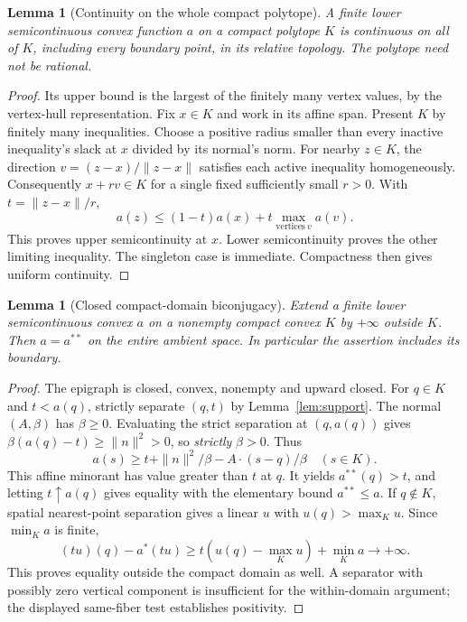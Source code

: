 \documentclass[11pt]{article}
\newtheorem{lemma}[theorem]{Lemma}
\begin{document}
\begin{lemma}[Continuity on the whole compact polytope]\label{lem:boundary}
A finite lower semicontinuous convex function $a$ on a compact polytope $K$ is continuous on all of $K$, including every boundary point, in its relative topology. The polytope need not be rational.
\end{lemma}
\begin{proof}
Its upper bound is the largest of the finitely many vertex values, by the vertex-hull representation. Fix $x\in K$ and work in its affine span. Present $K$ by finitely many inequalities. Choose a positive radius smaller than every inactive inequality's slack at $x$ divided by its normal's norm. For nearby $z\in K$, the direction $v=(z-x)/\|z-x\|$ satisfies each active inequality homogeneously. Consequently $x+rv\in K$ for a single fixed sufficiently small $r>0$. With $t=\|z-x\|/r$,
\[
 a(z)\leq(1-t)a(x)+t\max_{\mathrm{vertices}\ v}a(v).
\]
This proves upper semicontinuity at $x$. Lower semicontinuity proves the other limiting inequality. The singleton case is immediate. Compactness then gives uniform continuity.
\end{proof}

\begin{lemma}[Closed compact-domain biconjugacy]\label{lem:biconj}
Extend a finite lower semicontinuous convex $a$ on a nonempty compact convex $K$ by $+\infty$ outside $K$. Then $a=a^{**}$ on the entire ambient space. In particular the assertion includes its boundary.
\end{lemma}
\begin{proof}
The epigraph is closed, convex, nonempty and upward closed. For $q\in K$ and $t<a(q)$, strictly separate $(q,t)$ by Lemma~\ref{lem:support}. The normal $(A,\beta)$ has $\beta\geq0$. Evaluating the strict separation at $(q,a(q))$ gives
$\beta(a(q)-t)\geq\|n\|^2>0$, so \emph{strictly} $\beta>0$. Thus
\[
 a(s)\geq t+\|n\|^2/\beta-A\cdot(s-q)/\beta\quad(s\in K).
\]
This affine minorant has value greater than $t$ at $q$. It yields $a^{**}(q)>t$, and letting $t\uparrow a(q)$ gives equality with the elementary bound $a^{**}\leq a$. If $q\notin K$, spatial nearest-point separation gives a linear $u$ with $u(q)>\max_Ku$. Since $\min_Ka$ is finite,
\[
 (tu)(q)-a^*(tu)\geq t(u(q)-\max_Ku)+\min_Ka\longrightarrow+\infty.
\]
This proves equality outside the compact domain as well. A separator with possibly zero vertical component is insufficient for the within-domain argument; the displayed same-fiber test establishes positivity.
\end{proof}
\end{document}
